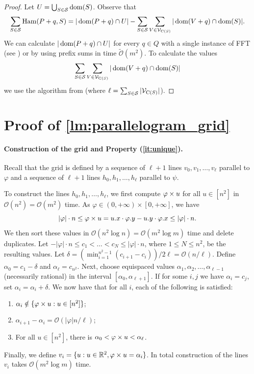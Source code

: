 \documentclass[11pt, letterpaper]{article}
\theoremstyle{plain}
\theoremstyle{definition}
\theoremstyle{remark}
\newcommand{\R}{\mathbb{R}}
\renewcommand{\O}{\mathcal{O}}
\newcommand{\tO}{\tilde{\mathcal{O}}}
\renewcommand{\S}{\mathcal{S}}
\newcommand{\V}{\mathcal{V}}
\renewcommand{\phi}{\varphi}
\DeclareMathOperator*{\Ham}{Ham}
\begin{document}
\SparseAlgo
\begin{proof}
	Let $U = \bigcup_{S \in \S} \d{S}$. Observe that
	\[ \sum_{S \in \S} \Ham(P + q, S) = |\d{P + q} \cap U| - \sum_{S \in \S}\sum_{V \in \V_{\getchar{S}}} |\d{V + q} \cap \d{S}|.\]
	We can calculate $|\operatorname*{dom}(P + q) \cap U|$ for every $q \in Q$ with a single instance of FFT (see ) or by using prefix sums in time $\tO(m^2)$.
	To calculate the values
	\[ \sum_{S \in \S}\sum_{V \in \V_{\getchar{S}}} |\d{V + q} \cap \d{S}| \]
	we use the algorithm from  (where $\ell = \sum_{S \in \S} |\V_{\getchar{S}}|$).
\end{proof}



\appendix
\section{Proof of \cref{lm:parallelogram_grid}}
\label{app:parallelogram_grid}
\paragraph*{Construction of the grid and Property (\ref{it:unique}).}
Recall that the grid is defined by a sequence of $\ell+1$ lines $v_0, v_1, \ldots, v_\ell$ parallel to $\phi$ and a sequence of $\ell+1$ lines $h_0, h_1, \ldots, h_\ell$ parallel to $\psi$. 

To construct the lines $h_0, h_1, \ldots, h_\ell$, we first compute $\h{u}$ for all $u \in [n^2]$ in $\O(n^2) = \O(m^2)$ time. As $\phi \in (0,+\infty) \times [0,+\infty]$, we have 
$$|\phi| \cdot n \le \h{u} = \x{u} \cdot \y{\phi} - \y{u} \cdot \x{\phi} \le |\phi| \cdot n.$$
We then sort these values in $\O(n^2 \log n) = \O(m^2 \log m)$ time and delete duplicates. Let $-|\phi| \cdot n \le c_1 < \ldots < c_{N} \le |\phi| \cdot n$, where $1 \le N \le n^2$, be the resulting values. Let $\delta = (\min_{i=1}^{n^2-1} (c_{i+1}-c_i))/2\ell = \O(n/\ell)$. Define $\alpha_0 = c_1 -\delta$ and $\alpha_\ell = c_{n^2}$. Next, choose equispaced values $\alpha_1, \alpha_2, \ldots, \alpha_{\ell-1}$ (necessarily rational) in the interval $[\alpha_0, \alpha_{\ell+1}]$. If for some $i, j$ we have $\alpha_i = c_j$, set $\alpha_i = \alpha_i + \delta$. We now have that for all $i$, each of the following is satisfied:
\begin{enumerate}
\item $\alpha_i \notin \{\h{u} : u \in [n^2]\}$;
\item $\alpha_{i+1}-\alpha_i = \O(|\phi| n / \ell)$;
\item For all $u \in [n^2]$, there is $\alpha_0 < \h{u} < \alpha_\ell$.
\end{enumerate}
Finally, we define $v_i = \{u: u \in \R^2, \h{u} = \alpha_i\}$. In total construction of the lines $v_i$ takes $\O(m^2 \log m)$ time.
\end{document}

